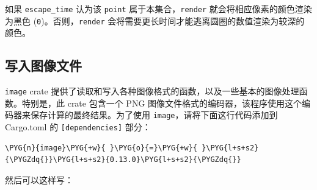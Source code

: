 如果 \texttt{escape\_time} 认为该 \texttt{point} 属于本集合，\texttt{render} 就会将相应像素的颜色渲染为黑色 (\texttt{0})。否则，\texttt{render} 会将需要更长时间才能逃离圆圈的数值渲染为较深的颜色。

\subsection{写入图像文件}

\texttt{image} crate 提供了读取和写入各种图像格式的函数，以及一些基本的图像处理函数。特别是，此 crate 包含一个 PNG 图像文件格式的编码器，该程序使用这个编码器来保存计算的最终结果。为了使用 \texttt{image}，请将下面这行代码添加到 Cargo.toml 的 \texttt{[dependencies]} 部分：

\begin{Verbatim}[commandchars=\\\{\},breaklines=true,breakanywhere=true,fontsize=\codefont,xleftmargin=17bp]
\PYG{n}{image}\PYG{+w}{ }\PYG{o}{=}\PYG{+w}{ }\PYG{l+s+s2}{\PYGZdq{}}\PYG{l+s+s2}{0.13.0}\PYG{l+s+s2}{\PYGZdq{}}
\end{Verbatim}

然后可以这样写：

